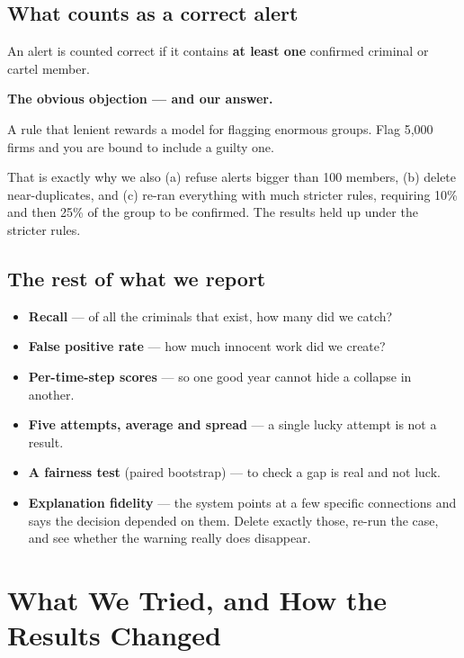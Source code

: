 \documentclass[11pt,a4paper]{article}
\begin{document}
\subsection{What counts as a correct alert}

An alert is counted correct if it contains \textbf{at least one} confirmed
criminal or cartel member.

\begin{warnbox}
\textbf{The obvious objection --- and our answer.}

A rule that lenient rewards a model for flagging enormous groups. Flag 5{,}000
firms and you are bound to include a guilty one.

That is exactly why we also (a) refuse alerts bigger than 100 members, (b) delete
near-duplicates, and (c) re-ran everything with much stricter rules, requiring
10\% and then 25\% of the group to be confirmed. The results held up under the
stricter rules.
\end{warnbox}

\subsection{The rest of what we report}

\begin{itemize}
  \item \textbf{Recall} --- of all the criminals that exist, how many did we catch?
  \item \textbf{False positive rate} --- how much innocent work did we create?
  \item \textbf{Per-time-step scores} --- so one good year cannot hide a collapse
        in another.
  \item \textbf{Five attempts, average and spread} --- a single lucky attempt is
        not a result.
  \item \textbf{A fairness test} (paired bootstrap) --- to check a gap is real and
        not luck.
  \item \textbf{Explanation fidelity} --- the system points at a few specific
        connections and says the decision depended on them. Delete exactly
        those, re-run the case, and see whether the warning really does
        disappear.
\end{itemize}

\section{What We Tried, and How the Results Changed}
\label{sec:tuning}
\end{document}
